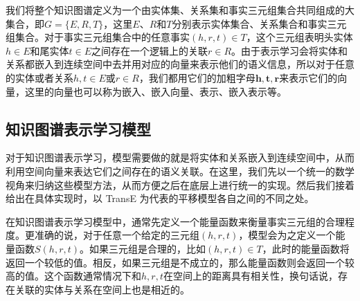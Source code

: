 我们将整个知识图谱定义为一个由实体集、关系集和事实三元组集合共同组成的大集合，即$G = \{E, R, T\}$，这里$E$、$R$和$T$分别表示实体集合、关系集合和事实三元组集合。对于事实三元组集合中的任意事实$(h, r, t) \in T$，这个三元组表明头实体$h \in E$和尾实体$t \in E$之间存在一个逻辑上的关联$r \in R$。由于表示学习会将实体和关系都嵌入到连续空间中去并用对应的向量来表示他们的语义信息，所以对于任意的实体或者关系$h, t \in E$或$r \in R$，我们都用它们的加粗字母$\mathbf{h}, \mathbf{t}, \mathbf{r}$来表示它们的向量，这里的向量也可以称为嵌入、嵌入向量、表示、嵌入表示等。

\subsection{知识图谱表示学习模型}

对于知识图谱表示学习，模型需要做的就是将实体和关系嵌入到连续空间中，从而利用空间向量来表达它们之间存在的语义关联。在这里，我们先以一个统一的数学视角来归纳这些模型方法，从而方便之后在底层上进行统一的实现。然后我们接着给出在具体实现时，以 TransE 为代表的平移模型各自之间的不同之处。

在知识图谱表示学习模型中，通常先定义一个能量函数来衡量事实三元组的合理程度。更准确的说，对于任意一个给定的三元组$(h, r, t)$，模型会为之定义一个能量函数$S(h, r, t)$。如果三元组是合理的，比如$(h, r, t)\in T$，此时的能量函数将返回一个较低的值。相反，如果三元组是不成立的，那么能量函数则会返回一个较高的值。这个函数通常情况下和$h, r, t$在空间上的距离具有相关性，换句话说，存在关联的实体与关系在空间上也是相近的。

